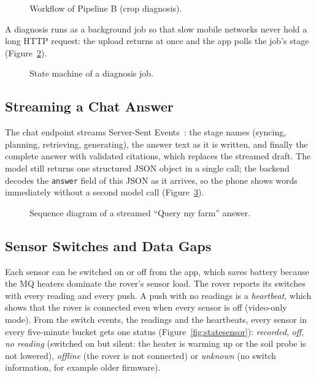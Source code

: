 \begin{figure}[H]
\centering

\caption{Workflow of Pipeline B (crop diagnosis).}
\label{fig:flowb}
\end{figure}

A diagnosis runs as a background job so that slow mobile networks never hold a long HTTP request: the upload returns at once
and the app polls the job's stage (Figure~\ref{fig:statejob}).

\begin{figure}[H]
\centering

\caption{State machine of a diagnosis job.}
\label{fig:statejob}
\end{figure}

\subsection{Streaming a Chat Answer}

The chat endpoint streams Server-Sent Events~\cite{whatwgsse}: the stage names (syncing, planning, retrieving, generating), the answer text as
it is written, and finally the complete answer with validated citations, which replaces the streamed draft. The model still
returns one structured JSON object in a single call; the backend decodes the \texttt{answer} field of this JSON as it arrives, so
the phone shows words immediately without a second model call (Figure~\ref{fig:sequence}).

\begin{figure}[H]
\centering

\caption{Sequence diagram of a streamed ``Query my farm'' answer.}
\label{fig:sequence}
\end{figure}

\subsection{Sensor Switches and Data Gaps}

Each sensor can be switched on or off from the app, which saves battery because the MQ heaters dominate the rover's sensor load.
The rover reports its switches with every reading and every push. A push with no readings is a \emph{heartbeat}, which shows
that the rover is connected even when every sensor is off (video-only mode). From the switch events, the readings and the
heartbeats, every sensor in every five-minute bucket gets one status (Figure~\ref{fig:statesensor}): \emph{recorded},
\emph{off}, \emph{no reading} (switched on but silent: the heater is warming up or the soil probe is not lowered),
\emph{offline} (the rover is not connected) or \emph{unknown} (no switch information, for example older firmware).


